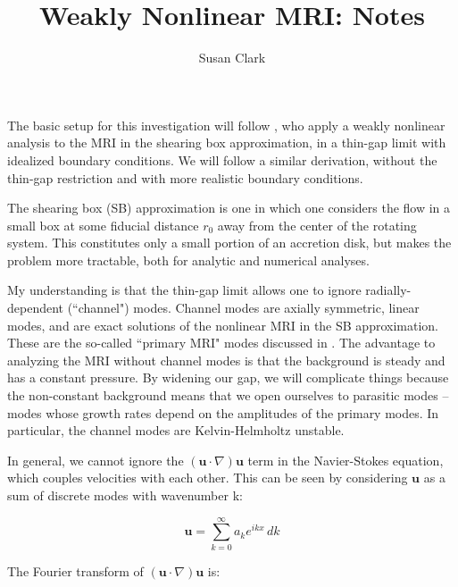 \documentclass[letterpaper,12pt]{article}
\begin{document}
\pagestyle{plain}

\title{Weakly Nonlinear MRI: Notes}
\author{Susan Clark}
\maketitle
\vspace{0.2cm}

The basic setup for this investigation will follow \citet{Umurhan:2007dz}, who apply a weakly nonlinear analysis to the MRI in the shearing box approximation, in a thin-gap limit with idealized boundary conditions. We will follow a similar derivation, without the thin-gap restriction and with more realistic boundary conditions.

The shearing box (SB) approximation is one in which one considers the flow in a small box at some fiducial distance ${r_0}$ away from the center of the rotating system. This constitutes only a small portion of an accretion disk, but makes the problem more tractable, both for analytic and numerical analyses. 

My understanding is that the thin-gap limit allows one to ignore radially-dependent (``channel") modes. Channel modes are axially symmetric, linear modes, and are exact solutions of the nonlinear MRI in the SB approximation. These are the so-called ``primary MRI" modes discussed in \citet{Pessah:2010ic}. The advantage to analyzing the MRI without channel modes is that the background is steady and has a constant pressure. By widening our gap, we will complicate things because the non-constant background means that we open ourselves to parasitic modes -- modes whose growth rates depend on the amplitudes of the primary modes. In particular, the channel modes are Kelvin-Helmholtz unstable. 

In general, we cannot ignore the $\left(\textbf{u} \cdot \nabla \right) \textbf{u}$ term in the Navier-Stokes equation, which couples velocities with each other. %
This can be seen by considering $\textbf{u}$ as a sum of discrete modes with wavenumber k:

\begin{equation}
\textbf{u} = \sum\limits_{k = 0}^{\infty}a_k e^{ikx} \, dk
\end{equation}

\noindent The Fourier transform of $\left(\textbf{u} \cdot \nabla \right) \textbf{u}$ is:
\end{document}
